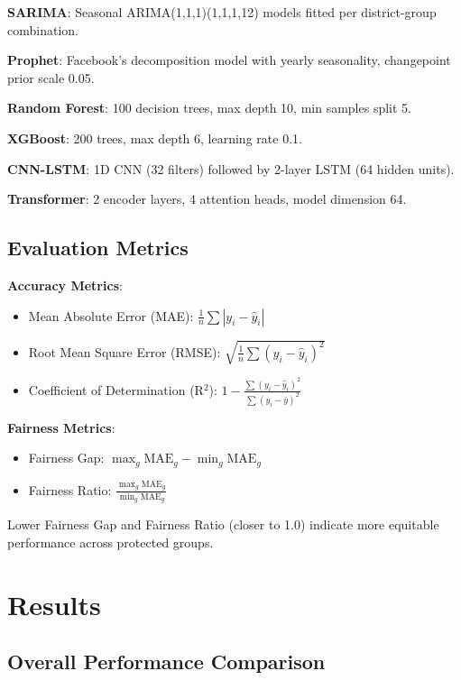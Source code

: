 \documentclass[conference]{IEEEtran}
\begin{document}
\textbf{SARIMA}: Seasonal ARIMA(1,1,1)(1,1,1,12) models fitted per district-group combination.

\textbf{Prophet}: Facebook's decomposition model with yearly seasonality, changepoint prior scale 0.05.

\textbf{Random Forest}: 100 decision trees, max depth 10, min samples split 5.

\textbf{XGBoost}: 200 trees, max depth 6, learning rate 0.1.

\textbf{CNN-LSTM}: 1D CNN (32 filters) followed by 2-layer LSTM (64 hidden units).

\textbf{Transformer}: 2 encoder layers, 4 attention heads, model dimension 64.

\subsection{Evaluation Metrics}

\textbf{Accuracy Metrics}:
\begin{itemize}
    \item Mean Absolute Error (MAE): $\frac{1}{n}\sum|y_i - \hat{y}_i|$
    \item Root Mean Square Error (RMSE): $\sqrt{\frac{1}{n}\sum(y_i - \hat{y}_i)^2}$
    \item Coefficient of Determination (R$^2$): $1 - \frac{\sum(y_i - \hat{y}_i)^2}{\sum(y_i - \bar{y})^2}$
\end{itemize}

\textbf{Fairness Metrics}:
\begin{itemize}
    \item Fairness Gap: $\max_g \text{MAE}_g - \min_g \text{MAE}_g$
    \item Fairness Ratio: $\frac{\max_g \text{MAE}_g}{\min_g \text{MAE}_g}$
\end{itemize}

Lower Fairness Gap and Fairness Ratio (closer to 1.0) indicate more equitable performance across protected groups.

\section{Results}

\subsection{Overall Performance Comparison}
\end{document}
